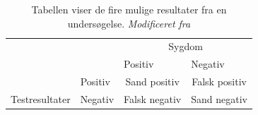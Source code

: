 \begin{table}[]
\centering
\begin{tabular}{llcc}
\rowcolor[HTML]{C0C0C0} 
\cellcolor[HTML]{C0C0C0}                                 &         & \multicolumn{2}{c}{\cellcolor[HTML]{C0C0C0}Sygdom}        \\ \cline{2-4} 
\cellcolor[HTML]{C0C0C0}                                 &         & \multicolumn{1}{l}{Positiv} & \multicolumn{1}{l}{Negativ} \\
\cellcolor[HTML]{C0C0C0}                                 & Positiv & Sand positiv                & Falsk positiv               \\
\multirow{-4}{*}{\cellcolor[HTML]{C0C0C0}Testresultater} & Negativ & Falsk negativ               & Sand negativ               
\end{tabular}
\caption{Tabellen viser de fire mulige resultater fra en undersøgelse. \textit{Modificeret fra } }
\label{tab:pos_neg}
\end{table}


